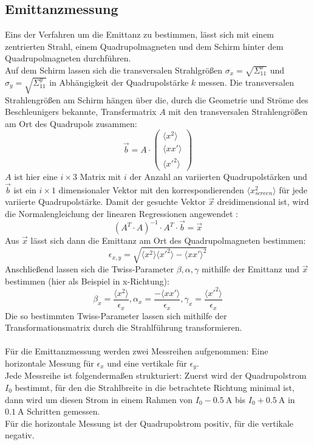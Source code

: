 \documentclass[10pt,a4paper, bibliography=totoc]{scrartcl}
\begin{document}
\subsection{Emittanzmessung}
\label{sec: emittanzmessung}
Eins der Verfahren um die Emittanz zu bestimmen, lässt sich mit einem zentrierten Strahl, einem Quadrupolmagneten und dem Schirm hinter dem Quadrupolmagneten durchführen.\\
Auf dem Schirm lassen sich die transversalen Strahlgrößen $\sigma_x=\sqrt{\Sigma^x_{11}}$ und $\sigma_y=\sqrt{\Sigma^y_{11}}$ in Abhängigkeit der Quadrupolstärke $k$ messen. Die transversalen Strahlengrößen am Schirm hängen über die, durch die Geometrie und Ströme des Beschleunigers bekannte, Transfermatrix $A$ mit den transversalen Strahlengrößen am Ort des Quadrupols zusammen:
\begin{equation}
	\vec{b} = A\cdot\begin{pmatrix} \langle x^2\rangle \\ \langle xx'\rangle \\ \langle x'^2\rangle \end{pmatrix}
    \label{eq:vecb}
\end{equation}
$A$ ist hier eine $i\times 3$ Matrix mit $i$ der Anzahl an variierten Quadrupolstärken und $\vec{b}$ ist ein $i\times 1$ dimensionaler Vektor mit den korrespondierenden $\langle x^2_{screen}\rangle$ für jede variierte Quadrupolstärke. Damit der gesuchte Vektor $\vec{x}$ dreidimensional ist, wird die Normalengleichung der linearen Regressionen angewendet \cite{1}:
\begin{equation}
	(A^T\cdot A)^{-1}\cdot A^T\cdot \vec{b}=\vec{x}
    \label{eq:normalengllinreg}
\end{equation}
Aus $\vec{x}$ lässt sich dann die Emittanz am Ort des Quadrupolmagneten bestimmen:
\begin{equation}
	\epsilon_{x,y}=\sqrt{\langle x^2\rangle \langle x'^2\rangle-\langle xx'\rangle^2}
    \label{eq:emittanz}
\end{equation}
Anschließend lassen sich die Twiss-Parameter $\beta, \alpha, \gamma$ mithilfe der Emittanz und $\vec{x}$ bestimmen (hier als Beispiel in x-Richtung):
\begin{equation}
	\beta_x=\frac{\langle x^2\rangle}{\epsilon_x}, \alpha_x=\frac{-\langle xx'\rangle}{\epsilon_x}, \gamma_x=\frac{\langle x'^2\rangle}{\epsilon_x}
    \label{eq:Twissparameter}
\end{equation}
Die so bestimmten Twiss-Parameter lassen sich mithilfe der Transformationsmatrix durch die Strahlführung transformieren.\\\\
Für die Emittanzmessung werden zwei Messreihen aufgenommen: Eine horizontale Messung für $\epsilon_x$ und eine vertikale für $\epsilon_y$.\\
Jede Messreihe ist folgendermaßen strukturiert: Zuerst wird der Quadrupolstrom $I_0$ bestimmt, für den die Strahlbreite in die betrachtete Richtung minimal ist, dann wird um diesen Strom in einem Rahmen von $I_0-\qty{0,5}{\ampere}$ bis $I_0+\qty{0,5}{\ampere}$ in $\qty{0,1}{\ampere}$ Schritten gemessen.\\
Für die horizontale Messung ist der Quadrupolstrom positiv, für die vertikale negativ.
\end{document}
